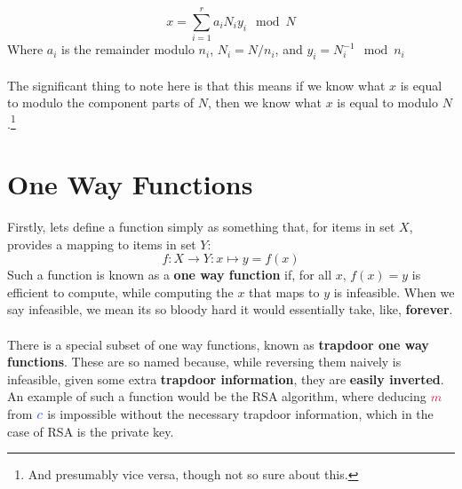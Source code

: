         $$ x = \sum\limits_{i=1}^{r} a_i N_i y_i \mod N $$
        Where $a_i$ is the remainder modulo $n_i$, $N_i = N/n_i$, and $y_i = N_i^{-1} \mod n_i$\\
        \\
        The significant thing to note here is that this means if we know what $x$ is equal to modulo the component parts of $N$, then we know what $x$ is equal to modulo $N$.\footnote{And presumably vice versa, though not so sure about this.}

    
    \section{One Way Functions}
        Firstly, lets define a function simply as something that, for items in set $X$, provides a mapping to items in set $Y$:
        $$f\colon X \rightarrow Y : x \mapsto y = f(x)$$
        Such a function is known as a \textbf{one way function} if, for all $x$, $f(x) = y$ is efficient to compute, while computing the $x$ that maps to $y$ is infeasible. When we say infeasible, we mean its so bloody hard it would essentially take, like, \textbf{forever}.\\
        \\
        There is a special subset of one way functions, known as \textbf{trapdoor one way functions}. These are so named because, while reversing them naively is infeasible, given some extra \textbf{trapdoor information}, they are \textbf{easily inverted}. An example of such a function would be the RSA algorithm, where deducing $\cm$ from $\cc$ is impossible without the necessary trapdoor information, which in the case of RSA is the private key.


    
